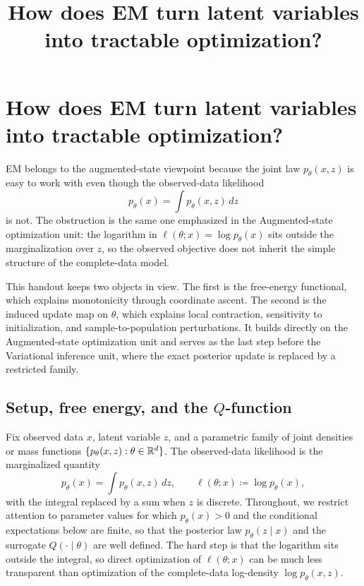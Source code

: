 \documentclass[11pt]{article}
\title{How does EM turn latent variables into tractable optimization?}
\author{}
\date{}
\begin{document}
\maketitle

\section[EM as augmented-state optimization]{How does EM turn latent variables into tractable optimization?}
\label{sec:em-why-hard}

EM belongs to the augmented-state viewpoint because the joint law $p_\theta(x,z)$ is easy to work with even though the observed-data likelihood
\[
p_\theta(x)=\int p_\theta(x,z)\,dz
\]
is not.
The obstruction is the same one emphasized in the Augmented-state optimization unit:
the logarithm in $\ell(\theta;x)=\log p_\theta(x)$ sits outside the marginalization over $z$, so the observed objective does not inherit the simple structure of the complete-data model.

This handout keeps two objects in view.
The first is the free-energy functional, which explains monotonicity through coordinate ascent.
The second is the induced update map on $\theta$, which explains local contraction, sensitivity to initialization, and sample-to-population perturbations.
It builds directly on the Augmented-state optimization unit and serves as the last step before the Variational inference unit, where the exact posterior update is replaced by a restricted family.

\subsection{Setup, free energy, and the \texorpdfstring{$Q$}{Q}-function}
\label{subsec:em-q-function}

Fix observed data $x$, latent variable $z$, and a parametric family of joint densities or mass functions $\{p_\theta(x,z): \theta\in\mathbb{R}^d\}$.
The observed-data likelihood is the marginalized quantity
\[
p_\theta(x)=\int p_\theta(x,z)\,dz,
\qquad
\ell(\theta;x)\coloneqq \log p_\theta(x),
\]
with the integral replaced by a sum when $z$ is discrete.
Throughout, we restrict attention to parameter values for which $p_\theta(x)>0$ and the conditional expectations below are finite, so that the posterior law $p_\theta(z\mid x)$ and the surrogate $Q(\cdot\mid\theta)$ are well defined.
The hard step is that the logarithm sits outside the integral, so direct optimization of $\ell(\theta;x)$ can be much less transparent than optimization of the complete-data log-density $\log p_\theta(x,z)$.
\end{document}
